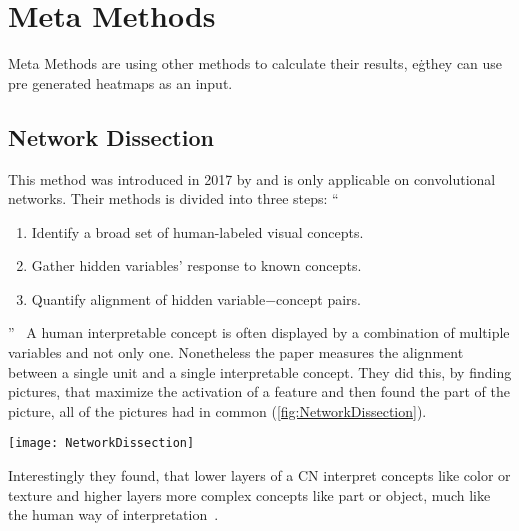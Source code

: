 \section{Meta Methods}
Meta Methods are using other methods to calculate their results, e\.g\. they can use pre generated heatmaps as an input.

\subsection{Network Dissection}
This method was introduced in 2017 by  and is only applicable on convolutional networks. Their methods is divided into three steps: 
“
\begin{enumerate}
    \item Identify a broad set of human-labeled visual concepts. 
    \item Gather hidden variables’ response to known concepts.
    \item Quantify alignment of hidden variable−concept pairs.
\end{enumerate}
”~\cite[2]{Bau.2017}
A human interpretable concept is often displayed by a combination of multiple variables and not only one. Nonetheless the paper measures the alignment between a single unit and a single interpretable concept. 
They did this, by finding pictures, that maximize the activation of a feature and then found the part of the picture, all of the pictures had in common (\cref{fig:NetworkDissection}).
\begin{figure*}[ht]
    \center{}
    \texttt{[image: NetworkDissection]}
    \caption{Network Dissection --- concept “lamp”,~\cite{Bau.2017}}\label{fig:NetworkDissection}
\end{figure*}

Interestingly they found, that lower layers of a CN interpret concepts like color or texture and higher layers more complex concepts like part or object, much like the human way of interpretation~\cite{Bau.2017}.

